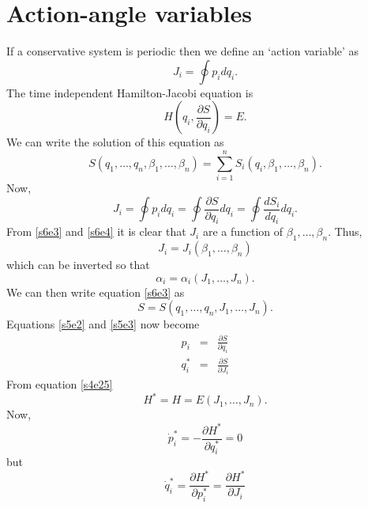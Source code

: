 \documentclass{article}
\newcommand{\pd}[2]{\frac{\partial{#1}}{\partial{#2}}}
\numberwithin{equation}{section}
\theoremstyle{plain}
\numberwithin{thm}{section}
\theoremstyle{plain}
\numberwithin{prop}{section}
\theoremstyle{definition}
\numberwithin{defn}{section}
\theoremstyle{remark}
\begin{document}
\section{Action-angle variables}\label{s6}
If a conservative system is periodic then we define an `action variable' as
\begin{equation}\label{s6e1}
J_i = \oint p_idq_i.
\end{equation}
The time independent Hamilton-Jacobi equation is
\begin{equation}\label{s6e2}
H\left(q_i, \pd{S}{q_i}\right) = E.
\end{equation}
We can write the solution of this equation as
\begin{equation}\label{s6e3}
S(q_1, \ldots, q_n, \beta_1, \ldots, \beta_n) = 
\sum_{i=1}^n S_i(q_i, \beta_1, \ldots, \beta_n).
\end{equation}
Now,
\begin{equation}\label{s6e4}
J_i = \oint p_i dq_i = \oint \pd{S}{q_i}dq_i = \oint \frac{dS_i}{dq_i}dq_i.
\end{equation}
From \eqref{s6e3} and \eqref{s6e4} it is clear that $J_i$ are a function of
$\beta_1, \ldots, \beta_n$. Thus,
\begin{equation}\label{s6e5}
J_i = J_i(\beta_1, \ldots, \beta_n)
\end{equation}
which can be inverted so that
\begin{equation}\label{s6e6}
\alpha_i = \alpha_i(J_1, \ldots, J_n).
\end{equation}
We can then write equation \eqref{s6e3} as
\begin{equation}\label{s6e7}
S = S(q_1, \ldots, q_n, J_1, \ldots, J_n).
\end{equation}
Equations \eqref{s5e2} and \eqref{s5e3} now become
\begin{eqnarray}
p_i &=& \pd{S}{q_i} \label{s6e8} \\
q_i^\ast &=& \pd{S}{J_i} \label{s6e9}
\end{eqnarray}
From equation \eqref{s4e25}
\begin{equation}\label{s6e10}
H^\ast = H = E(J_1, \ldots, J_n).
\end{equation}
Now,
\begin{equation}\label{s6e11}
\dot{p}_i^\ast = -\pd{H^\ast}{q_i^\ast} = 0
\end{equation}
but
\begin{equation}\label{s6e12}
\dot{q}_i^\ast = \pd{H^\ast}{p_i^\ast} = \pd{H^\ast}{J_i}
\end{equation}
\end{document}
